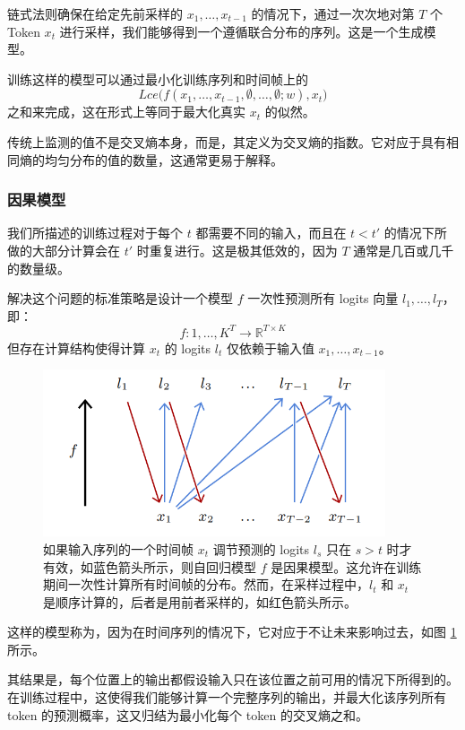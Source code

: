链式法则确保在给定先前采样的 $x_1,\dots,x_{t-1}$ 的情况下，通过一次次地对第 $T$ 个 Token $x_t$ 进行采样，我们能够得到一个遵循联合分布的序列。这是一个生成模型。

训练这样的模型可以通过最小化训练序列和时间帧上的
\[Lce\big(f(x_1,\dots,x_{t-1},\emptyset,\dots,\emptyset;w),x_t\big)\]
之和来完成，这在形式上等同于最大化真实 $x_t$ 的似然。

传统上监测的值不是交叉熵本身，而是，其定义为交叉熵的指数。它对应于具有相同熵的均匀分布的值的数量，这通常更易于解释。

\subsubsection*{因果模型}

我们所描述的训练过程对于每个 $t$ 都需要不同的输入，而且在 $t < t'$ 的情况下所做的大部分计算会在 $t'$ 时重复进行。这是极其低效的，因为 $T$ 通常是几百或几千的数量级。

解决这个问题的标准策略是设计一个模型 $f$ 一次性预测所有 logits 向量 $l_1,\dots,l_T$，即：
\[f : {1,\dots,K}^T \to \mathbb{R}^{T \times K}\]
但存在计算结构使得计算 $x_t$ 的 logits $l_t$ 仅依赖于输入值 $x_1,\dots,x_{t-1}$。

\begin{figure}
    \centering
    \includegraphics[width=0.9\textwidth]{fig/fig3.1.png}
    \caption[因果自回归模型]{如果输入序列的一个时间帧 $x_t$ 调节预测的 logits $l_s$ 只在 $s > t$ 时才有效，如蓝色箭头所示，则自回归模型 $f$ 是因果模型。这允许在训练期间一次性计算所有时间帧的分布。然而，在采样过程中，$l_t$ 和 $x_t$ 是顺序计算的，后者是用前者采样的，如红色箭头所示。}
    \label{fig3.1}
\end{figure}

这样的模型称为，因为在时间序列的情况下，它对应于不让未来影响过去，如图 \ref{fig3.1} 所示。

其结果是，每个位置上的输出都假设输入只在该位置之前可用的情况下所得到的。在训练过程中，这使得我们能够计算一个完整序列的输出，并最大化该序列所有 token 的预测概率，这又归结为最小化每个 token 的交叉熵之和。

